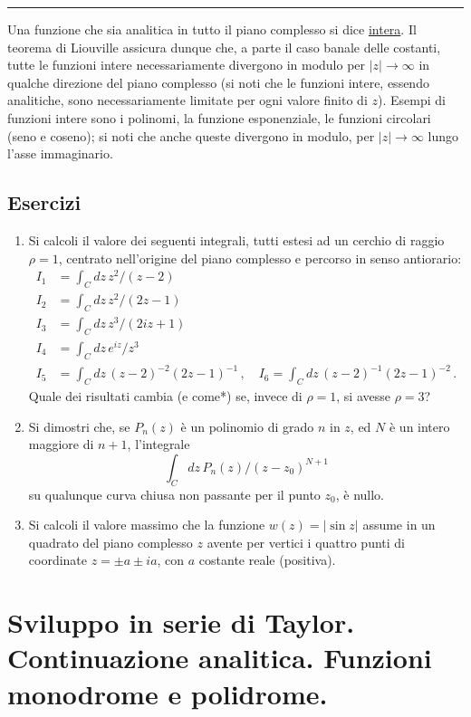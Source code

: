 \documentclass[11pt, a4paper]{book}
\numberwithin{equation}{section}
\newenvironment{esercizi}{\subsection*{Esercizi}\begin{enumerate}}{\end{enumerate}}
\begin{document}
\medskip\hrule\medskip

Una funzione che sia analitica in tutto il piano complesso si dice \uline{intera}. Il teorema di Liouville assicura dunque che, a parte il caso banale delle costanti, tutte le funzioni intere necessariamente divergono in modulo per $|z| \to \infty$ in qualche direzione del piano complesso (si noti che le funzioni intere, essendo analitiche, sono necessariamente limitate per ogni valore finito di $z$). Esempi di funzioni intere sono i polinomi, la funzione esponenziale, le funzioni circolari (seno e coseno); si noti che anche queste divergono in modulo, per $|z| \to \infty$ lungo l'asse immaginario.

\begin{esercizi}

\item Si calcoli il valore dei seguenti integrali, tutti estesi ad un cerchio di raggio $\rho = 1$, centrato nell'origine del piano complesso e percorso in senso antiorario:
\begin{align*}
I_1 &= \int_C dz\, z^2/(z-2) \\
I_2 &= \int_C dz\, z^2/(2z-1) \\
I_3 &= \int_C dz\, z^3/(2iz+1) \\
I_4 &= \int_C dz\, e^{iz}/z^3 \\
I_5 &= \int_C dz\, (z-2)^{-2}(2z-1)^{-1}\,, \quad
I_6 = \int_C dz\, (z-2)^{-1}(2z-1)^{-2}\,.
\end{align*}
Quale dei risultati cambia (e come*) se, invece di $\rho = 1$, si avesse $\rho = 3$?

\item Si dimostri che, se $P_n(z)$ è un polinomio di grado $n$ in $z$, ed $N$ è un intero maggiore di $n+1$, l'integrale
\[
\int_C dz\, P_n(z)/(z-z_0)^{N+1}
\]
su qualunque curva chiusa non passante per il punto $z_0$, è nullo.

\item Si calcoli il valore massimo che la funzione $w(z) = |\sin z|$ assume in un quadrato del piano complesso $z$ avente per vertici i quattro punti di coordinate $z = \pm a \pm ia$, con $a$ costante reale (positiva).

\end{esercizi}

\section{Sviluppo in serie di Taylor. Continuazione analitica. Funzioni monodrome e polidrome.}
\end{document}
